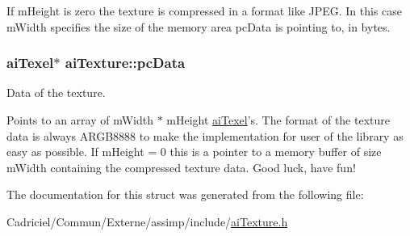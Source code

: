 If m\-Height is zero the texture is compressed in a format like J\-P\-E\-G. In this case m\-Width specifies the size of the memory area pc\-Data is pointing to, in bytes. \hypertarget{structai_texture_aeb07528748b6e49d2d81c60006024f9a}{
\subsubsection[{pc\-Data}]{ {\bf ai\-Texel}$\ast$ ai\-Texture\-::pc\-Data}}\label{structai_texture_aeb07528748b6e49d2d81c60006024f9a}
Data of the texture.

Points to an array of m\-Width $\ast$ m\-Height \hyperlink{structai_texel}{ai\-Texel}'s. The format of the texture data is always A\-R\-G\-B8888 to make the implementation for user of the library as easy as possible. If m\-Height = 0 this is a pointer to a memory buffer of size m\-Width containing the compressed texture data. Good luck, have fun! 

The documentation for this struct was generated from the following file\-:\begin{DoxyCompactItemize}
\item 
Cadriciel/\-Commun/\-Externe/assimp/include/\hyperlink{ai_texture_8h}{ai\-Texture.\-h}\end{DoxyCompactItemize}
